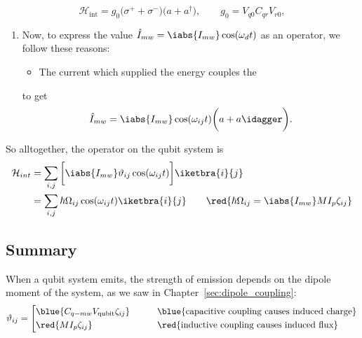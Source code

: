 \begin{framed}\noindent
  \begin{equation}
    \mathcal{H}_{\text{int}}=g_0\big(\sigma^++\sigma^-\big)\big(a+a^\dagger\big),          \qquad
    g_0=V_{q0}C_{qr}V_{r0},
  \end{equation}
\end{framed}

\begin{enumerate}


\item         Now,         to          express         the         value
  $  \hat{I}_{mw} =  \iabs{I_{mw}}\cos(\omega_dt)$  as  an operator,  we
  follow these reasons:
  \begin{itemize}
  \item The current which supplied the energy couples the
  \end{itemize}
  \noindent to get
  \begin{equation}\label{eq:couple15}
    \hat{I}_{mw} = \iabs{I_{mw}}\cos(\omega_{ij}t)\bigg(a + a\idagger\bigg).
  \end{equation}
\end{enumerate}

\begin{framed}\noindent
  So alltogether, the operator on the qubit system is
  \begin{equation}\label{eq:couple16}
    \begin{aligned}
      \mathcal{H}_{int} & = \sum_{i,j}{\bigg[\iabs{I_{mw}}\vartheta_{ij}\cos(\omega_{ij}t)\bigg]}\iketbra{i}{j}\\
      & = \sum_{i,j} \hbar\Omega_{ij} \cos(\omega_{ij}t) \iketbra{i}{j}\qquad \red{\hbar\Omega_{ij} = \iabs{I_{mw}}MI_p\zeta_{ij}}\\
    \end{aligned}
  \end{equation}

\end{framed}



\subsection{Summary \cite{Astafiev2010}}
\begin{framed}\noindent
  \noindent When a qubit system  emits, the strength of emission depends
  on   the   dipole    moment   of   the   system,   as    we   saw   in
  Chapter~\ref{sec:dipole_coupling}:
  \begin{equation}\label{eq:couple17}
    \vartheta_{ij} = \left[\begin{aligned}
        & \blue{C_{q-mw}V_\text{qubit}\zeta_{ij}} \qquad&& \text{\blue{capacitive coupling causes induced charge}}\\
        & \red{MI_p\zeta_{ij}} \qquad&& \text{\red{inductive coupling causes induced flux}}
      \end{aligned}\right.
  \end{equation}
\end{framed}

